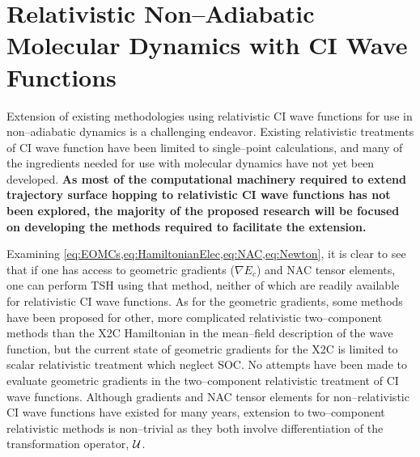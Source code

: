 \linespread{1.0}
\section{Relativistic Non--Adiabatic Molecular Dynamics with CI Wave Functions}
\mylinesp
\label{sec:Future}

Extension of existing methodologies using relativistic CI wave functions for use
in non--adiabatic dynamics is a challenging endeavor. Existing relativistic
treatments of CI wave function have been limited to single--point calculations,
and many of the ingredients needed for use with molecular dynamics have not yet
been developed.
{\bf As most of the computational machinery required to extend trajectory
surface hopping to relativistic CI wave functions has not been explored, the majority of the proposed
research will be focused on developing the methods required to facilitate the
extension.}

Examining \cref{eq:EOMCs,eq:HamiltonianElec,eq:NAC,eq:Newton}, it is clear to
see that if one has access to geometric gradients ($\nabla E_c$) and NAC tensor
elements, one can perform TSH using that method, neither of which are readily
available for relativistic CI wave functions. As for the geometric gradients,
some methods have been proposed for other, more complicated relativistic
two--component methods\cite{Nakai16_JCTC2181,Cremer15_JCP214106} than the X2C
Hamiltonian in the mean--field description of the wave function, but the current
state of geometric gradients for the X2C is limited to scalar relativistic
treatment which neglect SOC\cite{Gauss11_JCP084114}. No attempts have been made
to evaluate geometric gradients in the two--component relativistic treatment of
CI wave functions. Although gradients and NAC tensor elements for
non--relativistic CI wave functions have existed for many years, extension to
two--component relativistic methods is non--trivial as they both involve
differentiation of the transformation operator, $\mathcal{U}$.

